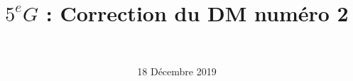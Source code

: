 \documentclass[a4paper,11pt]{exam}
\author{\ }
\date{18 Décembre 2019}
\title{$5^e G$ : Correction du DM num\'ero 2}
\begin{document}
%	

	\maketitle
	
%

	
	
	


\label{LastPage}

%
\end{document}

